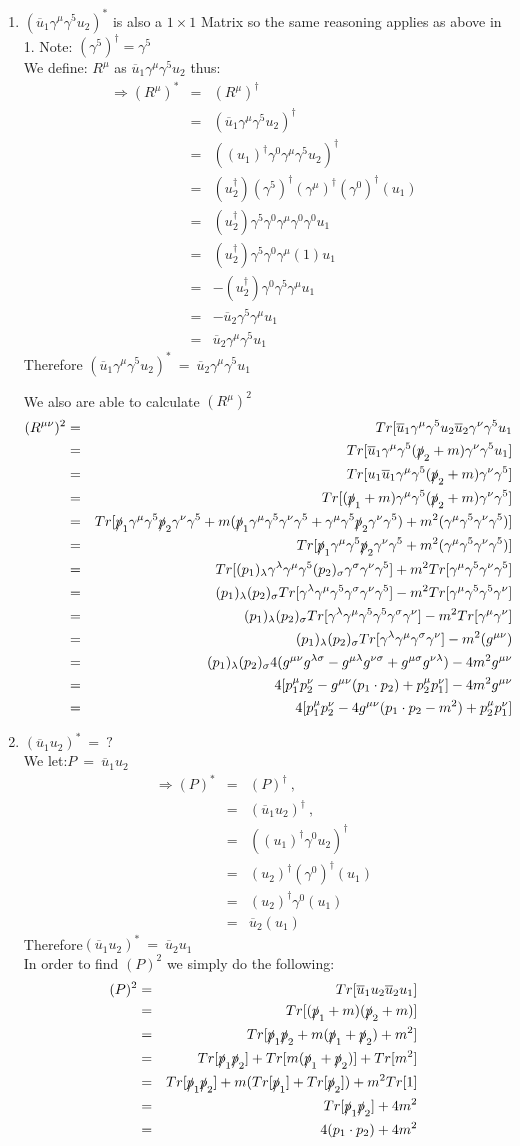 \documentclass[12pt]{article}
\def \bea{\begin{eqnarray}}
\def \eea{\end{eqnarray}}
\def \nn{ }
\def \nl{\nn \\}
\def \ou{\overline{u}}
\def \ga{\gamma}
\def \la{\lambda}
\def \si{\sigma}
\begin{document}
\begin{enumerate}
\item $(\ou_1\ga^\mu \ga^5 u_2)^*$ is also a $1\times1$ Matrix so the same reasoning applies as above in 1. Note: $(\ga^5)^\dag = \ga^5$\nl
We define: $R^\mu$ as $\ou_1\ga^\mu\ga^5 u_2$ thus:
\bea
\Rightarrow (R^\mu)^* &=& (R^\mu)^\dag \\\nonumber
&=&(\ou_1\ga^\mu\ga^5 u_2)^\dag  \nl\nonumber
&=& ((u_1)^\dag\ga^0\ga^\mu\ga^5 u_2)^\dag \nl\nonumber
&=& (u_2^\dag)(\ga^5)^\dag(\ga^\mu)^\dag(\ga^0)^\dag(u_1)\nl\nonumber
&=& (u_2^\dag)\ga^5\ga^0\ga^\mu\ga^0\ga^0 u_1\nl\nonumber
&=& (u_2^\dag)\ga^5\ga^0\ga^\mu(1) u_1\nl\nonumber
&=& -(u_2^\dag)\ga^0\ga^5\ga^\mu u_1\nl\nonumber
&=& -\ou_2\ga^5\ga^\mu u_1 \nl
&=& \ou_2\ga^\mu\ga^5 u_1
\eea 
%
Therefore $(\ou_1\ga^\mu \ga^5 u_2)^*~=~\ou_2 \ga^\mu \ga^5 u_1$

We also are able to calculate $(R^\mu)^2$ 
\bea
(R^{\mu\nu})^2 &=& Tr[\ou_1\ga^\mu \ga^5 u_2\ou_2 \ga^\nu \ga^5 u_1 \\\nonumber
&=& Tr[\ou_1\ga^\mu \ga^5 (\slashed{p}_2+m) \ga^\nu \ga^5 u_1]  \nl\nonumber
&=&Tr[u_1\ou_1\ga^\mu \ga^5 (\slashed{p}_2+m) \ga^\nu \ga^5 ]\nl\nonumber
&=&Tr[(\slashed{p}_1+m)\ga^\mu \ga^5 (\slashed{p}_2+m) \ga^\nu \ga^5 ]\nl\nonumber
&=& Tr[\slashed{p}_1\ga^\mu\ga^5 \slashed{p}_2\ga^\nu \ga^5 + m( \slashed{p}_1\ga^\mu\ga^5\ga^\nu \ga^5 +\ga^\mu\ga^5 \slashed{p}_2\ga^\nu \ga^5) + m^2(\ga^\mu\ga^5\ga^\nu \ga^5)] \nl \nonumber
&=&Tr[\slashed{p}_1\ga^\mu\ga^5 \slashed{p}_2\ga^\nu \ga^5 + m^2(\ga^\mu\ga^5\ga^\nu \ga^5)] \nl\nonumber
&=& Tr[(p_1)_\la\ga^\la\ga^\mu\ga^5 (p_2)_\si\ga^\si\ga^\nu \ga^5] + m^2Tr[\ga^\mu\ga^5\ga^\nu \ga^5]\nl\nonumber
&=& (p_1)_\la(p_2)_\si Tr[\ga^\la\ga^\mu\ga^5 \ga^\si\ga^\nu \ga^5] - m^2Tr[\ga^\mu\ga^5\ga^5 \ga^\nu]\nl\nonumber
&=& (p_1)_\la(p_2)_\si Tr[\ga^\la\ga^\mu\ga^5\ga^5 \ga^\si\ga^\nu] - m^2Tr[\ga^\mu\ga^\nu]\nl\nonumber
&=& (p_1)_\la(p_2)_\si Tr[\ga^\la\ga^\mu\ga^\si\ga^\nu] - m^2(g^{\mu\nu})\nl\nonumber
&=& (p_1)_\la(p_2)_\si 4(g^{\mu\nu}g^{\la\si} - g^{\mu\la} g^{\nu\si} + g^{\mu\si}g^{\nu\la}) - 4m^2g^{\mu\nu}\nl\nonumber
&=& 4[p_1^\mu p_2^\nu - g^{\mu\nu}(p_1 \cdot p_2) + p_2^\mu p_1^\nu] - 4m^2g^{\mu\nu} \nl
&=& 4[p_1^\mu p_2^\nu - 4g^{\mu\nu}(p_1 \cdot p_2 - m^2) + p_2^\mu p_1^\nu]
\eea

\item $ (\ou_1 u_2)^* ~=~ ?$ \nl
We let:$P ~=~ \ou_1 u_2$
\bea
\Rightarrow (P)^* &=& (P)^\dag ~,~~ \\\nonumber
&=& (\ou_1 u_2)^\dag ~,~~ \nl\nonumber
&=& ((u_1)^\dag\ga^0 u_2)^\dag \nl\nonumber
&=& (u_2)^\dag(\ga^0)^\dag(u_1)\nl\nonumber
&=& (u_2)^\dag\ga^0(u_1)\nl
&=& \ou_2(u_1)
\eea
Therefore$(\ou_1 u_2)^* ~=~ \ou_2 u_1$\nl 
In order to find $(P)^2$ we simply do the following: 
\bea
(P)^2&=& Tr[\ou_1 u_2 \ou_2 u_1]  \\\nonumber
&=& Tr[(\slashed{p}_1+m)(\slashed{p}_2+m)] \nl\nonumber
&=& Tr[\slashed{p}_1\slashed{p}_2+m(\slashed{p}_1+\slashed{p}_2)+m^2]\nl\nonumber
&=& Tr[\slashed{p}_1\slashed{p}_2]+Tr[m(\slashed{p}_1+\slashed{p}_2)]+Tr[m^2] \nl\nonumber
&=& Tr[\slashed{p}_1\slashed{p}_2]+m(Tr[\slashed{p}_1]+Tr[\slashed{p}_2])+m^2Tr[1] \nl\nonumber
&=& Tr[\slashed{p}_1\slashed{p}_2]+4m^2 \nl
&=& 4(p_1 \cdot p_2)+4m^2
\eea


\end{enumerate}
\end{document}
